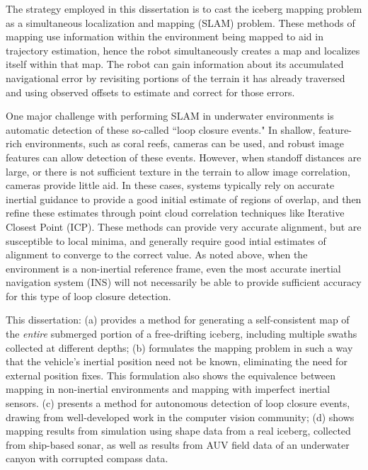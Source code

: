 The strategy employed in this dissertation is to cast the iceberg mapping problem as a simultaneous localization and mapping (SLAM) problem. These methods of mapping use information within the environment being mapped to aid in trajectory estimation, hence the robot simultaneously creates a map and localizes itself within that map. The robot can gain information about its accumulated navigational error by revisiting portions of the terrain it has already traversed and using observed offsets to estimate and correct for those errors. 

One major challenge with performing SLAM in underwater environments is automatic detection of these so-called ``loop closure events." In shallow, feature-rich environments, such as coral reefs, cameras can be used, and robust image features can allow detection of these events. However, when standoff distances are large, or there is not sufficient texture in the terrain to allow image correlation, cameras provide little aid. In these cases, systems typically rely on accurate inertial guidance to provide a good initial estimate of regions of overlap, and then refine these estimates through point cloud correlation techniques like Iterative Closest Point (ICP). These methods can provide very accurate alignment, but are susceptible to local minima, and generally require good intial estimates of alignment to converge to the correct value. As noted above, when the environment is a non-inertial reference frame, even the most accurate inertial navigation system (INS) will not necessarily be able to provide sufficient accuracy for this type of loop closure detection. 

This dissertation: (a) provides a method for generating a self-consistent map of the \emph{entire} submerged portion of a free-drifting iceberg, including multiple swaths collected at different depths; (b) formulates the mapping problem in such a way that the vehicle's inertial position need not be known, eliminating the need for external position fixes. This formulation also shows the equivalence between mapping in non-inertial environments and mapping with imperfect inertial sensors. (c) presents a method for autonomous detection of loop closure events, drawing from well-developed work in the computer vision community; (d) shows mapping results from simulation using shape data from a real iceberg, collected from ship-based sonar, as well as results from AUV field data of an underwater canyon with corrupted compass data. 



